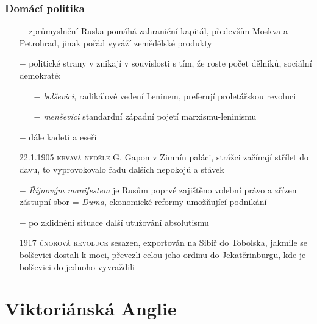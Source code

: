 \documentclass{article}
\begin{document}
\subsubsection*{Domácí politika}
\begin{itemize}
    \vspace{-0.5em}
    \setlength\itemsep{0.15em}
    \item[$-$] zprůmyslnění Ruska pomáhá zahraniční kapitál, především Moskva a Petrohrad, jinak pořád vyváží zemědělské produkty
    \item[$-$] politické strany v znikají v souvislosti s tím, že roste počet dělníků, sociální demokraté:
    \begin{itemize}
        \vspace{-0.5em}
        \setlength\itemsep{0.15em}
        \item[$-$] \textit{bolševici}, radikálové vedení Leninem, preferují proletářskou revoluci
        \item[$-$] \textit{menševici} standardní západní pojetí marxismu-leninismu
    \end{itemize}
    \item[$-$] dále kadeti a eseři
    \item[22.1.1905] \textsc{krvavá neděle} G. Gapon v Zimnín paláci, strážci začínají střílet do davu, to vyprovokovalo řadu dalších nepokojů a stávek
    \item[$-$] \textit{Říjnovým manifestem} je Rusům poprvé zajištěno volební právo a zřízen zástupní sbor = \textit{Duma}, ekonomické reformy umožňující podnikání
    \item[$-$] po zklidnění situace další utužování absolutismu
    \item[1917] \textsc{únorová revoluce} sesazen, exportován na Sibiř do Tobolska, jakmile se bolševici dostali k moci, převezli celou jeho ordinu do Jekatěrinburgu, kde je bolševici do jednoho vyvraždili
\end{itemize}

\section*{Viktoriánská Anglie}
\end{document}
